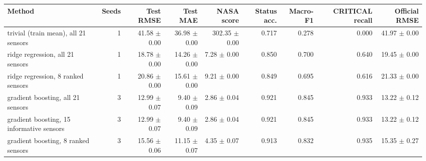 \begin{tabular}{lrrrrrrrr}
\toprule
Method & Seeds & Test RMSE & Test MAE & NASA score & Status acc. & Macro-F1 & CRITICAL recall & Official RMSE \\
\midrule
trivial (train mean), all 21 sensors & 1 & 41.58 $\pm$ 0.00 & 36.98 $\pm$ 0.00 & 302.35 $\pm$ 0.00 & 0.717 & 0.278 & 0.000 & 41.97 $\pm$ 0.00 \\
ridge regression, all 21 sensors & 1 & 18.78 $\pm$ 0.00 & 14.26 $\pm$ 0.00 & 7.28 $\pm$ 0.00 & 0.850 & 0.700 & 0.640 & 19.45 $\pm$ 0.00 \\
ridge regression, 8 ranked sensors & 1 & 20.86 $\pm$ 0.00 & 15.61 $\pm$ 0.00 & 9.21 $\pm$ 0.00 & 0.849 & 0.695 & 0.616 & 21.33 $\pm$ 0.00 \\
gradient boosting, all 21 sensors & 3 & 12.99 $\pm$ 0.07 & 9.40 $\pm$ 0.09 & 2.86 $\pm$ 0.04 & 0.921 & 0.845 & 0.933 & 13.22 $\pm$ 0.12 \\
gradient boosting, 15 informative sensors & 3 & 12.99 $\pm$ 0.07 & 9.40 $\pm$ 0.09 & 2.86 $\pm$ 0.04 & 0.921 & 0.845 & 0.933 & 13.22 $\pm$ 0.12 \\
gradient boosting, 8 ranked sensors & 3 & 15.56 $\pm$ 0.06 & 11.15 $\pm$ 0.07 & 4.35 $\pm$ 0.07 & 0.913 & 0.832 & 0.935 & 15.35 $\pm$ 0.27 \\
\bottomrule
\end{tabular}
